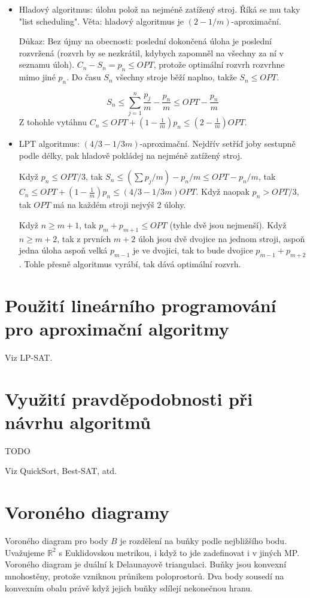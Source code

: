 \documentclass[a4paper,10pt,titlepage]{article} \usepackage[utf8]{inputenc}
\def\R{\mathbb{R}}
\begin{document}
\begin{itemize}
\item Hladový algoritmus: úlohu polož na nejméně zatížený stroj.
	Říká se mu taky "list scheduling".
	Věta: hladový algoritmus je $(2-1/m)$-aproximační.

	Důkaz:
	Bez újmy na obecnosti: poslední dokončená úloha je poslední rozvržená (rozvrh
	by se nezkrátil, kdybych zapomněl na všechny za ní v seznamu úloh).
	$C_n-S_n=p_n\leq OPT$, protože optimální rozvrh rozvrhne mimo jiné $p_n$.
	Do času $S_n$ všechny stroje běží naplno, takže $S_n\leq OPT$.

	$$S_n\leq \sum_{j=1}^n \frac{p_j}{m} - \frac{p_n}{m}\leq OPT-\frac{p_n}{m}$$
	Z tohohle vytáhnu $C_n\leq OPT+(1-\frac{1}{m})p_n\leq (2-\frac{1}{m})OPT$.
\item LPT algoritmus: $(4/3-1/3m)$-aproximační.
	Nejdřív setříď joby sestupně podle délky, pak hladově pokládej na
	nejméně zatížený stroj.

	Když $p_n\leq OPT/3$, tak $S_n\leq (\sum p_j/m)-p_n/m\leq OPT-p_n/m$,
	tak $C_n\leq OPT+(1-\frac{1}{m})p_n\leq (4/3-1/3m)OPT$.
	Když naopak $p_n>OPT/3$, tak $OPT$ má na každém stroji nejvýš
	2 úlohy.

	Když $n\geq m+1$, tak $p_m+p_{m+1}\leq OPT$ (tyhle dvě jsou nejmenší).
	Když $n\geq m+2$, tak z prvních $m+2$ úloh jsou dvě dvojice na jednom
	stroji, aspoň jedna úloha aspoň velká $p_{m-1}$ je ve dvojici,
	tak to bude dvojice $p_{m-1}+p_{m+2}$. Tohle přesně algoritmus
	vyrábí, tak dává optimální rozvrh.
\end{itemize}

\section{Použití lineárního programování pro aproximační algoritmy}
Viz LP-SAT.

\section{Využití pravděpodobnosti při návrhu algoritmů}
TODO

Viz QuickSort, Best-SAT, atd.

\section{Voroného diagramy}
Voroného diagram pro body $B$ je rozdělení na buňky podle nejbližšího
bodu. Uvažujeme $\R^2$ s Euklidovskou metrikou, i když to jde zadefinovat
i v jiných MP.
Voroného diagram je duální k Delaunayově triangulaci.
Buňky jsou konvexní mnohostěny, protože vzniknou průnikem poloprostorů.
Dva body sousedí na konvexním obalu právě když jejich buňky sdílejí nekonečnou
hranu.
\end{document}
